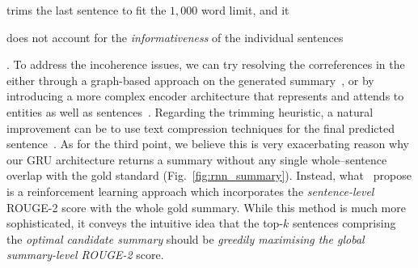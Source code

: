 \begin{itemize}
\begin{enumerate*}[label=(\alph*)]
            \item trims the last sentence to fit the $1,000$ word limit, and it
            \item does not account for the \emph{informativeness} of the individual sentences
        \end{enumerate*}.
        To address the incoherence issues, we can try resolving the correferences in the either through a
        graph-based approach on the generated summary~\cite{sonawane2016coreference}, or by introducing a more complex
        encoder architecture that represents and attends to entities as well as sentences~\cite{Huang2021ExtractiveSC}.
        Regarding the trimming heuristic, a natural improvement can be to use text compression techniques for the final predicted sentence~\cite{ghalandari2022efficient, KNIGHT200291}.
        As for the third point, we believe this is very exacerbating reason why our GRU architecture returns a summary
        without any single whole--sentence overlap with the gold standard (Fig.~\ref{fig:rnn_summary}).
        Instead, what~\cite{zmandar-etal-2021-joint} propose is a reinforcement learning approach which incorporates
        the \emph{sentence-level} ROUGE-2 score with the whole gold summary.
        While this method is much more sophisticated, it conveys the intuitive idea that the top-$k$ sentences comprising the
        \emph{optimal candidate summary} should be \emph{greedily maximising the global summary-level ROUGE-2} score.
\end{itemize}

